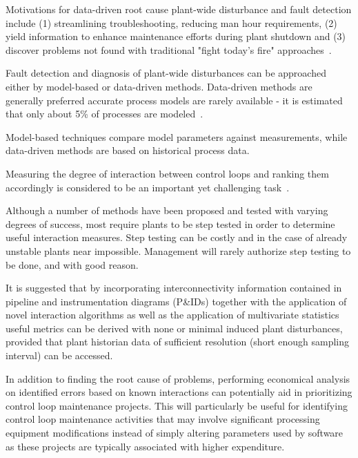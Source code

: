 \documentclass{article}
\begin{document}
Motivations for data-driven root cause plant-wide disturbance and fault detection include (1) streamlining troubleshooting, reducing man hour requirements, (2) yield information to enhance maintenance efforts during plant shutdown and (3) discover problems not found with traditional "fight today's fire" approaches~\citep{Bauer2005a}.

Fault detection and diagnosis of plant-wide disturbances can be approached either by model-based or data-driven methods.
Data-driven methods are generally preferred accurate process models are rarely available - it is estimated that only about 5\% of processes are modeled~\cite{Bauer2005a}. %

Model-based techniques compare model parameters against measurements, while data-driven methods are based on historical process data.

Measuring the degree of interaction between control loops and ranking them accordingly is considered to be an important yet challenging task~\cite{Rahman2011}.

Although a  number of methods have been proposed and tested with varying degrees of success, most require plants to be step tested in order to determine useful interaction measures.
Step testing can be costly and in the case of already unstable plants near impossible.
Management will rarely authorize step testing to be done, and with good reason.

It is suggested that by incorporating interconnectivity information contained in pipeline and instrumentation diagrams (P\&IDs) together with the application of novel interaction algorithms as well as the application of multivariate statistics useful metrics can be derived with none or minimal induced plant disturbances, provided that plant historian data of sufficient resolution (short enough sampling interval) can be accessed.

In addition to finding the root cause of problems, performing economical analysis on identified errors based on known interactions can potentially aid in prioritizing control loop maintenance projects.
This will particularly be useful for identifying control loop maintenance activities that may involve significant processing equipment modifications instead of simply altering parameters used by software as these projects are typically associated with higher expenditure.

\end{document}
